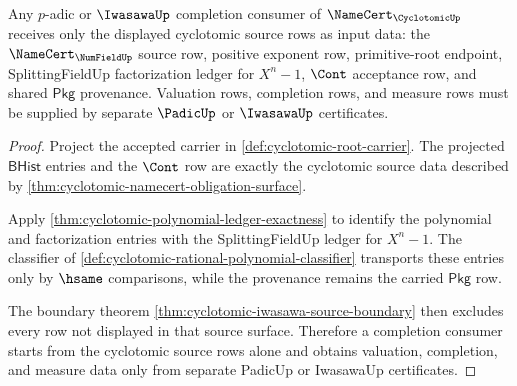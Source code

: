 \begin{theorem}
\label{thm:cyclotomic-padic-completion-input-boundary}
Any $p$-adic or $\IwasawaUp$ completion consumer of $\NameCert_{\CyclotomicUp}$ receives only the displayed cyclotomic source rows as input data: the $\NameCert_{\NumFieldUp}$ source row, positive exponent row, primitive-root endpoint, SplittingFieldUp factorization ledger for $X^n-1$, $\Cont$ acceptance row, and shared $\mathsf{Pkg}$ provenance. Valuation rows, completion rows, and measure rows must be supplied by separate $\PadicUp$ or $\IwasawaUp$ certificates.
\end{theorem}
\begin{proof}
Project the accepted carrier in \autoref{def:cyclotomic-root-carrier}. The projected $\mathsf{BHist}$ entries and the $\Cont$ row are exactly the cyclotomic source data described by \autoref{thm:cyclotomic-namecert-obligation-surface}.

Apply \autoref{thm:cyclotomic-polynomial-ledger-exactness} to identify the polynomial and factorization entries with the SplittingFieldUp ledger for $X^n-1$. The classifier of \autoref{def:cyclotomic-rational-polynomial-classifier} transports these entries only by $\hsame$ comparisons, while the provenance remains the carried $\mathsf{Pkg}$ row.

The boundary theorem \autoref{thm:cyclotomic-iwasawa-source-boundary} then excludes every row not displayed in that source surface. Therefore a completion consumer starts from the cyclotomic source rows alone and obtains valuation, completion, and measure data only from separate PadicUp or IwasawaUp certificates.
\end{proof}

